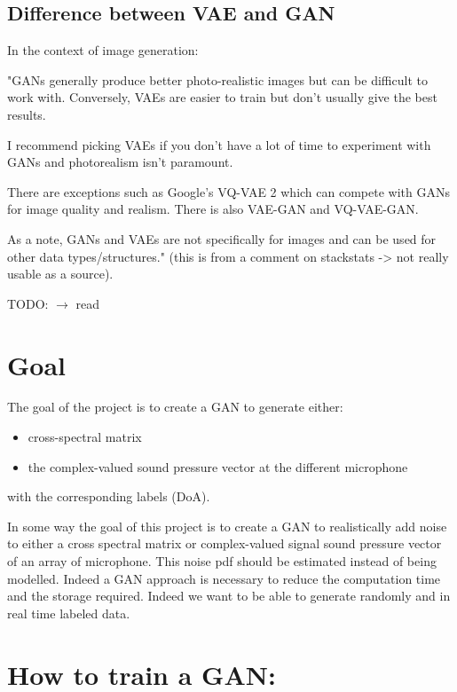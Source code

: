 \documentclass{article}
\begin{document}
\subsection{Difference between VAE and GAN}

In the context of image generation:

"GANs generally produce better photo-realistic images but can be difficult to work with. Conversely, VAEs are easier to train but don’t usually give the best results.

I recommend picking VAEs if you don’t have a lot of time to experiment with GANs and photorealism isn’t paramount.

There are exceptions such as Google’s VQ-VAE 2 which can compete with GANs for image quality and realism. There is also VAE-GAN and VQ-VAE-GAN.

As a note, GANs and VAEs are not specifically for images and can be used for other data types/structures." (this is from a comment on stackstats -> not really usable as a source).

TODO: $\rightarrow$ read \cite{10.1007/978-3-030-38961-1_8}



\section{Goal}

The goal of the project is to create a GAN to generate either:
\begin{itemize}
    \item cross-spectral matrix
    \item the complex-valued sound pressure vector at the different microphone
\end{itemize}
with the corresponding labels (DoA).

In some way the goal of this project is to create a GAN to realistically add noise to either a cross spectral matrix or complex-valued signal sound pressure vector of an array of microphone. This noise pdf should be estimated instead of being modelled. Indeed a GAN approach is necessary to reduce the computation time and the storage required. Indeed we want to be able to generate randomly and in real time labeled data.  

\section{How to train a GAN:}
\end{document}
